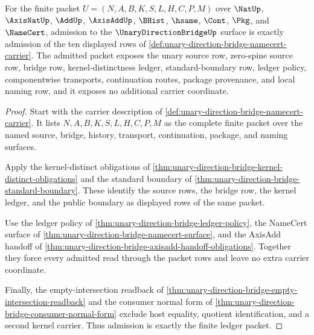 \begin{theorem}
\label{thm:unary-direction-bridge-carrier-admission}
For the finite packet $U=(N,A,B,K,S,L,H,C,P,M)$ over $\NatUp$, $\AxisNatUp$, $\AddUp$, $\AxisAddUp$, $\BHist$, $\hsame$, $\Cont$, $\Pkg$, and $\NameCert$, admission to the $\UnaryDirectionBridgeUp$ surface is exactly admission of the ten displayed rows of \autoref{def:unary-direction-bridge-namecert-carrier}. The admitted packet exposes the unary source row, zero-spine source row, bridge row, kernel-distinctness ledger, standard-boundary row, ledger policy, componentwise transports, continuation routes, package provenance, and local naming row, and it exposes no additional carrier coordinate.
\end{theorem}
\begin{proof}
Start with the carrier description of \autoref{def:unary-direction-bridge-namecert-carrier}. It lists $N,A,B,K,S,L,H,C,P,M$ as the complete finite packet over the named source, bridge, history, transport, continuation, package, and naming surfaces.

Apply the kernel-distinct obligations of \autoref{thm:unary-direction-bridge-kernel-distinct-obligations} and the standard boundary of \autoref{thm:unary-direction-bridge-standard-boundary}. These identify the source rows, the bridge row, the kernel ledger, and the public boundary as displayed rows of the same packet.

Use the ledger policy of \autoref{thm:unary-direction-bridge-ledger-policy}, the NameCert surface of \autoref{thm:unary-direction-bridge-namecert-surface}, and the AxisAdd handoff of \autoref{thm:unary-direction-bridge-axisadd-handoff-obligations}. Together they force every admitted read through the packet rows and leave no extra carrier coordinate.

Finally, the empty-intersection readback of \autoref{thm:unary-direction-bridge-empty-intersection-readback} and the consumer normal form of \autoref{thm:unary-direction-bridge-consumer-normal-form} exclude host equality, quotient identification, and a second kernel carrier. Thus admission is exactly the finite ledger packet.
\end{proof}

